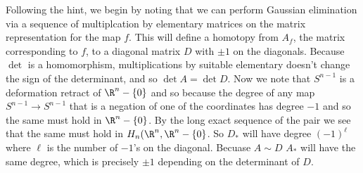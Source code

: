 \documentclass{article}
\begin{document}
\begin{solution}{\parindent}
  Following the hint, we begin by noting that we can perform Gaussian
  elimination via a sequence of multiplcation by elementary matrices
  on the matrix representation for the map $f$. This will define a
  homotopy from $A_f$, the matrix corresponding to $f$, to a diagonal
  matrix $D$ with $\pm 1$ on the diagonals. Because $\det$ is a
  homomorphism, multiplications by suitable elementary doesn't change
  the sign of the determinant, and so $\det A = \det D$. Now we note
  that $S^{n-1}$ is a deformation retract of $\R^n - \{0\}$ and so
  because the degree of any map $S^{n-1} \to S^{n-1}$ that is a
  negation of one of the coordinates has degree $-1$ and so the same
  must hold in $\R^{n}-\{0\}$. By the long exact sequence of the pair
  we see that the same must hold in $H_n(\R^n,\R^{n}-\{0\}$. So
  $D_\ast$ will have degree $(-1)^\ell$ where $\ell$ is the number of
  $-1$'s on the diagonal. Becuase $A \sim D$ $A_\ast$ will have the
  same degree, which is precisely $\pm 1$ depending on the determinant
  of $D$.
\end{solution}
\end{document}
